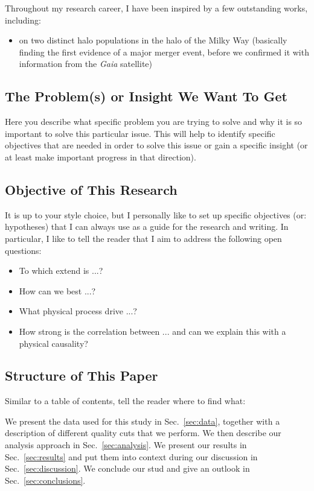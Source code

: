 \documentclass[fleqn,usenatbib]{mnras}
\newcommand{\Gaia}{\textit{Gaia}\xspace} %
\begin{document}
Throughout my research career, I have been inspired by a few outstanding works, including:
\begin{itemize}
    \item \cite{Nissen2010} on two distinct halo populations in the halo of the Milky Way (basically finding the first evidence of a major merger event, before we confirmed it with information from the \Gaia satellite)
\end{itemize}

\subsection{The Problem(s) or Insight We Want To Get} \label{sec:intro_problem}

Here you describe what specific problem you are trying to solve and why it is so important to solve this particular issue. This will help to identify specific objectives that are needed in order to solve this issue or gain a specific insight (or at least make important progress in that direction).

\subsection{Objective of This Research} \label{sec:intro_objectives}

It is up to your style choice, but I personally like to set up specific objectives (or: hypotheses) that I can always use as a guide for the research and writing. In particular, I like to tell the reader that I aim to address the following open questions:
\begin{itemize}
    \item To which extend is ...?
    \item How can we best ...?
    \item What physical process drive ...?
    \item How strong is the correlation between ... and can we explain this with a physical causality?
\end{itemize}

\subsection{Structure of This Paper} \label{sec:intro_structure}

Similar to a table of contents, tell the reader where to find what:

We present the data used for this study in Sec.~\ref{sec:data}, together with a description of different quality cuts that we perform. We then describe our analysis approach in Sec.~\ref{sec:analysis}. We present our results in Sec.~\ref{sec:results} and put them into context during our discussion in Sec.~\ref{sec:discussion}. We conclude our stud and give an outlook in Sec.~\ref{sec:conclusions}.
\end{document}
